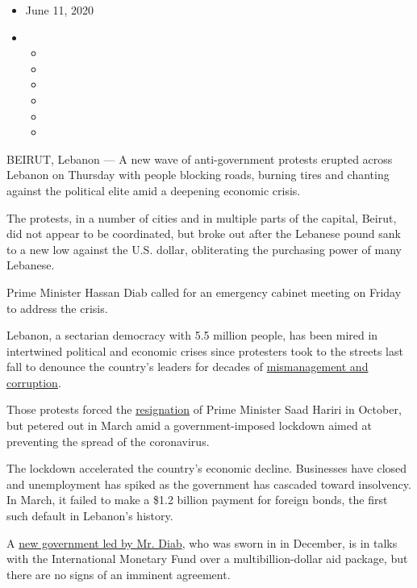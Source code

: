 \begin{itemize}
\item
  June 11, 2020
\item
  \begin{itemize}
  \item
  \item
  \item
  \item
  \item
  \item
  \end{itemize}
\end{itemize}

BEIRUT, Lebanon --- A new wave of anti-government protests erupted
across Lebanon on Thursday with people blocking roads, burning tires and
chanting against the political elite amid a deepening economic crisis.

The protests, in a number of cities and in multiple parts of the
capital, Beirut, did not appear to be coordinated, but broke out after
the Lebanese pound sank to a new low against the U.S. dollar,
obliterating the purchasing power of many Lebanese.

Prime Minister Hassan Diab called for an emergency cabinet meeting on
Friday to address the crisis.

Lebanon, a sectarian democracy with 5.5 million people, has been mired
in intertwined political and economic crises since protesters took to
the streets last fall to denounce the country's leaders for decades of
\href{https://www.nytimes3xbfgragh.onion/2019/12/03/world/middleeast/lebanon-protests-corruption.html}{mismanagement
and corruption}.

Those protests forced the
\href{https://www.nytimes3xbfgragh.onion/2019/12/19/world/middleeast/lebanon-prime-minister-hassan-diab.html}{resignation}
of Prime Minister Saad Hariri in October, but petered out in March amid
a government-imposed lockdown aimed at preventing the spread of the
coronavirus.

The lockdown accelerated the country's economic decline. Businesses have
closed and unemployment has spiked as the government has cascaded toward
insolvency. In March, it failed to make a \$1.2 billion payment for
foreign bonds, the first such default in Lebanon's history.

A
\href{https://www.nytimes3xbfgragh.onion/2019/12/19/world/middleeast/lebanon-prime-minister-hassan-diab.html}{new
government led by Mr. Diab}, who was sworn in in December, is in talks
with the International Monetary Fund over a multibillion-dollar aid
package, but there are no signs of an imminent agreement.

